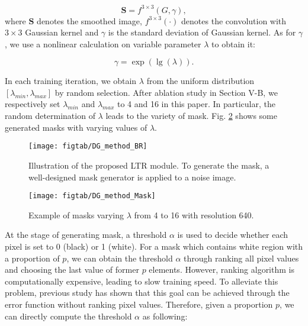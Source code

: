 \documentclass[twocolumn,journal,vlined,ruled,linesnumbered]{IEEEtran}
\begin{document}
\begin{equation}
\mathbf{S}=f^{3\times3}(G,\gamma),
\end{equation}
where $\mathbf{S}$ denotes the smoothed image, $f^{3\times3}(\cdot)$ denotes the convolution with $3\times3$ Gaussian kernel and $\gamma$ is the standard deviation of Gaussian kernel. As for $\gamma$, we use a nonlinear calculation on variable parameter $\lambda$ to obtain it:

\vspace{-2mm}

\begin{equation}
\gamma=\exp(\lg(\lambda)).\label{eq:}
\end{equation}

In each training iteration, we obtain $\lambda$ from the uniform distribution $[\lambda_{min},\lambda_{max}]$ by random selection. After ablation study in Section V-B, we respectively set $\lambda_{min}$ and $\lambda_{max}$ to 4 and 16 in this paper. In particular, the random determination of $\lambda$ leads to the variety of mask. Fig. \ref{fig:Example-masks-varying} shows some generated masks with varying values of $\lambda$.

\begin{figure}[t]
\begin{centering}
\texttt{[image: figtab/DG\_method\_BR]}
\par\end{centering}
\vspace{-2mm}
\caption{Illustration of the proposed LTR module. To generate the mask, a well-designed mask generator \cite{french2019semi} is applied to a noise image.\label{fig:An-illustration-of}}
\vspace{-2mm}
\end{figure}


\begin{figure}[t]
\begin{centering}
\texttt{[image: figtab/DG\_method\_Mask]}
\par\end{centering}
\vspace{-2mm}
\caption{Example of masks varying $\lambda$ from 4 to 16 with resolution 640.\label{fig:Example-masks-varying}}
\vspace{-4mm}
\end{figure}

At the stage of generating mask, a threshold $\alpha$ is used to decide whether each pixel is set to 0 (black) or 1 (white). For a mask which contains white region with a proportion of $p$, we can obtain the threshold $\alpha$ through ranking all pixel values and choosing the last value of former $p$ elements. However, ranking algorithm is computationally expensive, leading to slow training speed. To alleviate this problem, previous study \cite{french2019semi} has shown that this goal can be achieved through the error function \cite{andrews1998special} without ranking pixel values. Therefore, given a proportion $p$, we can directly compute the threshold $\alpha$ as following:
\end{document}
